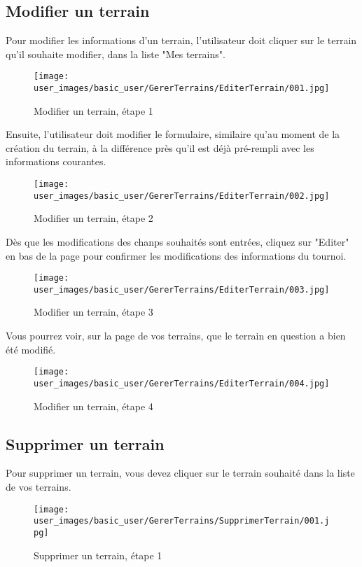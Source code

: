 \subsection{Modifier un terrain}

Pour modifier les informations d'un terrain, l'utilisateur doit cliquer sur le terrain qu'il souhaite modifier, dans la liste "Mes terrains".

\begin{figure}[H]
\centering
\texttt{[image: user\_images/basic\_user/GererTerrains/EditerTerrain/001.jpg]}
\caption{Modifier un terrain, étape 1}
\end{figure}

Ensuite, l'utilisateur doit modifier le formulaire, similaire qu'au moment de la création du terrain, à la différence près qu'il est déjà pré-rempli avec les informations courantes.

\begin{figure}[H]
\centering
\texttt{[image: user\_images/basic\_user/GererTerrains/EditerTerrain/002.jpg]}
\caption{Modifier un terrain, étape 2}
\end{figure}

Dès que les modifications des chanps souhaités sont entrées, cliquez sur "Editer" en bas de la page pour confirmer les modifications des informations du tournoi.

\begin{figure}[H]
\centering
\texttt{[image: user\_images/basic\_user/GererTerrains/EditerTerrain/003.jpg]}
\caption{Modifier un terrain, étape 3}
\end{figure}

Vous pourrez voir, sur la page de vos terrains, que le terrain en question a bien été modifié.

\begin{figure}[H]
\centering
\texttt{[image: user\_images/basic\_user/GererTerrains/EditerTerrain/004.jpg]}
\caption{Modifier un terrain, étape 4}
\end{figure}

\subsection{Supprimer un terrain}

Pour supprimer un terrain, vous devez cliquer sur le terrain souhaité dans la liste de vos terrains.

\begin{figure}[H]
\centering
\texttt{[image: user\_images/basic\_user/GererTerrains/SupprimerTerrain/001.jpg]}
\caption{Supprimer un terrain, étape 1}
\end{figure}

